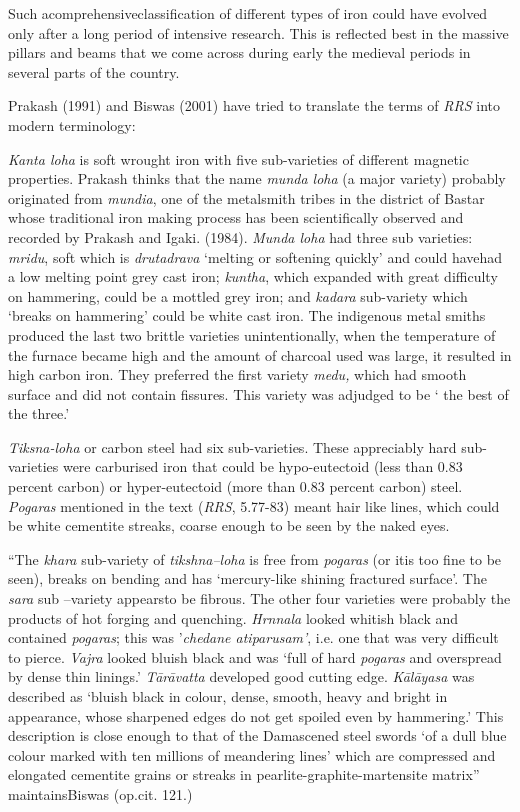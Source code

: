 Such acomprehensiveclassification of different types of iron could have evolved only after a long period of intensive research. This is reflected best in the massive pillars and beams that we come across during early the medieval periods in several parts of the country.

Prakash (1991) and Biswas (2001) have tried to translate the terms of \textit{RRS} into modern terminology:

\textit{Kanta loha} is soft wrought iron with five sub-varieties of different magnetic properties. Prakash thinks that the name \textit{munda loha} (a major variety) probably originated from \textit{mundia}, one of the metalsmith tribes in the district of Bastar whose traditional iron making process has been scientifically observed and recorded by Prakash and Igaki. (1984). \textit{Munda loha} had three sub varieties: \textit{mridu}, soft which is \textit{drutadrava }`melting or softening quickly' and could havehad a low melting point grey cast iron; \textit{kuntha}, which expanded with great difficulty on hammering, could be a mottled grey iron; and \textit{kadara} sub-variety which `breaks on hammering' could be white cast iron. The indigenous metal smiths produced the last two brittle varieties unintentionally, when the temperature of the furnace became high and the amount of charcoal used was large, it resulted in high carbon iron. They preferred the first variety \textit{medu,} which had smooth surface and did not contain fissures. This variety was adjudged to be ` the best of the three.'

\textit{Tiksna-loha} or carbon steel had six sub-varieties. These appreciably hard sub-varieties were carburised iron that could be hypo-eutectoid (less than 0.83 percent carbon) or hyper-eutectoid (more than 0.83 percent carbon) steel. \textit{Pogaras} mentioned in the text (\textit{RRS}, 5.77-83) meant hair like lines, which could be white cementite streaks, coarse enough to be seen by the naked eyes.

``The \textit{khara} sub-variety of \textit{tikshna–loha} is free from \textit{pogaras} (or itis too fine to be seen), breaks on bending and has `mercury-like shining fractured surface'. The \textit{sara} sub –variety appearsto be fibrous. The other four varieties were probably the products of hot forging and quenching. \textit{Hrnnala} looked whitish black and contained \textit{pogaras}; this was '\textit{chedane atiparusam'}, i.e. one that was very difficult to pierce. \textit{Vajra} looked bluish black and was `full of hard \textit{pogaras} and overspread by dense thin linings.' \textit{Tārāvatta} developed good cutting edge. \textit{Kālāyasa} was described as `bluish black in colour, dense, smooth, heavy and bright in appearance, whose sharpened edges do not get spoiled even by hammering.' This description is close enough to that of the Damascened steel swords `of a dull blue colour marked with ten millions of meandering lines' which are compressed and elongated cementite grains or streaks in pearlite-graphite-martensite matrix'' maintainsBiswas (op.cit. 121.)

